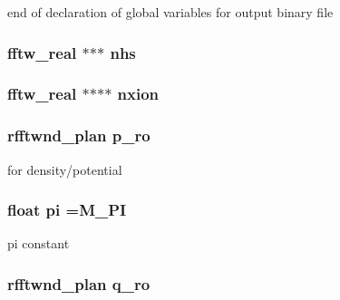 end of declaration of global variables for output binary file \hypertarget{struct_g_l_o_b_a_l_v_a_r_s_a75b9cc475a9b492f88ac81b10c17d615}{
\subsubsection[{nhs}]{\setlength{\rightskip}{0pt plus 5cm}fftw\+\_\+real $\ast$$\ast$$\ast$ nhs}}\label{struct_g_l_o_b_a_l_v_a_r_s_a75b9cc475a9b492f88ac81b10c17d615}
\hypertarget{struct_g_l_o_b_a_l_v_a_r_s_afe3435714e08d26c42c93e355d4d96f7}{
\subsubsection[{nxion}]{\setlength{\rightskip}{0pt plus 5cm}fftw\+\_\+real $\ast$$\ast$$\ast$$\ast$ nxion}}\label{struct_g_l_o_b_a_l_v_a_r_s_afe3435714e08d26c42c93e355d4d96f7}
\hypertarget{struct_g_l_o_b_a_l_v_a_r_s_a8e52ad9c7463e1b0688d4f0ce102c309}{
\subsubsection[{p\+\_\+ro}]{\setlength{\rightskip}{0pt plus 5cm}rfftwnd\+\_\+plan p\+\_\+ro}}\label{struct_g_l_o_b_a_l_v_a_r_s_a8e52ad9c7463e1b0688d4f0ce102c309}


for density/potential 

\hypertarget{struct_g_l_o_b_a_l_v_a_r_s_a9cb0638a7b1d7af8ff421d2dc025d3a8}{
\subsubsection[{pi}]{\setlength{\rightskip}{0pt plus 5cm}float pi =M\+\_\+\+P\+I}}\label{struct_g_l_o_b_a_l_v_a_r_s_a9cb0638a7b1d7af8ff421d2dc025d3a8}


pi constant 

\hypertarget{struct_g_l_o_b_a_l_v_a_r_s_ad8c20a2f4901d7fc9b4247d0b202aab6}{
\subsubsection[{q\+\_\+ro}]{\setlength{\rightskip}{0pt plus 5cm}rfftwnd\+\_\+plan q\+\_\+ro}}\label{struct_g_l_o_b_a_l_v_a_r_s_ad8c20a2f4901d7fc9b4247d0b202aab6}


